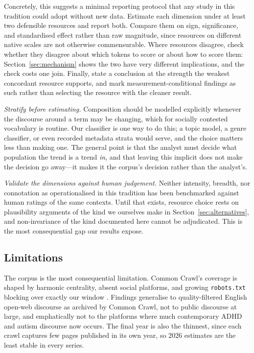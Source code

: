 \documentclass[final]{clv2025}
\begin{document}
Concretely, this suggests a minimal reporting protocol that any study in this tradition
could adopt without new data. Estimate each dimension under at least two defensible
resources and report both. Compare them on sign, significance, and standardised effect
rather than raw magnitude, since resources on different native scales are not otherwise
commensurable. Where resources disagree, check whether they disagree about which
tokens to score or about how to score them: Section~\ref{sec:mechanism} shows the two have
very different implications, and the check costs one join. Finally, state a conclusion at
the strength the weakest concordant resource supports, and mark measurement-conditional
findings as such rather than selecting the resource with the cleaner result.

\emph{Stratify before estimating.} Composition should be modelled explicitly whenever the
discourse around a term may be changing, which for socially contested vocabulary is
routine. Our classifier is one way to do this; a topic model, a genre classifier, or even
recorded metadata strata would serve, and the choice matters less than making one. The
general point is that the analyst must decide what population the trend is a trend
\emph{in}, and that leaving this implicit does not make the decision go away---it makes it
the corpus's decision rather than the analyst's.

\emph{Validate the dimensions against human judgement.} Neither intensity, breadth, nor
connotation as operationalised in this tradition has been benchmarked against human ratings
of the same contexts. Until that exists, resource choice rests on plausibility arguments of
the kind we ourselves make in Section~\ref{sec:alternatives}, and non-invariance of the
kind documented here cannot be adjudicated. This is the most consequential gap our results
expose.

\subsection{Limitations}

The corpus is the most consequential limitation. Common Crawl's coverage is shaped by
harmonic centrality, absent social platforms, and growing \texttt{robots.txt} blocking over
exactly our window \citep{baackCriticalAnalysisLargest2024}. Findings generalise to quality-filtered English open-web
discourse as archived by Common Crawl, not to public discourse at large, and emphatically
not to the platforms where much contemporary ADHD and autism discourse now occurs. The
final year is also the thinnest, since each crawl captures few pages published in its own
year, so 2026 estimates are the least stable in every series.
\end{document}
